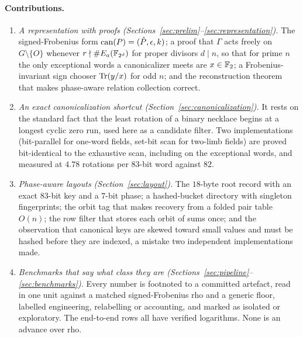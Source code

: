 \paragraph{Contributions.}
\begin{enumerate}[leftmargin=1.6em,itemsep=0.25em]
\item \emph{A representation with proofs
  (Sections~\ref{sec:prelim}--\ref{sec:representation}).} The
  signed-Frobenius form $\operatorname{can}(P)=(\hat P,\epsilon,k)$; a proof that
  $\Gamma$ acts freely on $G\setminus\{O\}$ whenever
  $r\nmid\#E_a(\mathbb{F}_{2^d})$ for proper divisors $d\mid n$, so that for
  prime $n$ the only exceptional words a canonicalizer meets are
  $x\in\mathbb{F}_2$; a Frobenius-invariant sign chooser $\operatorname{Tr}(y/x)$ for odd
  $n$; and the reconstruction theorem that makes phase-aware relation
  collection correct.
\item \emph{An exact canonicalization shortcut
  (Section~\ref{sec:canonicalization}).} It rests on the standard
  fact that the least rotation of a binary necklace begins at a
  longest cyclic zero run, used here as a candidate filter. Two
  implementations (bit-parallel for one-word fields, set-bit scan for
  two-limb fields) are proved bit-identical to the exhaustive scan,
  including on the exceptional words, and measured at $4.78$ rotations
  per $83$-bit word against $82$.
\item \emph{Phase-aware layouts (Section~\ref{sec:layout}).} The
  $18$-byte root record with an exact $83$-bit key and a $7$-bit phase;
  a hashed-bucket directory with singleton fingerprints; the orbit tag
  that makes recovery from a folded pair table $O(n)$; the row filter
  that stores each orbit of sums once; and the observation that
  canonical keys are skewed toward small values and must be hashed
  before they are indexed, a mistake two independent implementations
  made.
\item \emph{Benchmarks that say what class they are
  (Sections~\ref{sec:pipeline}--\ref{sec:benchmarks}).} Every number
  is footnoted to a committed artefact, read in one unit against a
  matched signed-Frobenius rho and a generic floor, labelled
  engineering, relabelling or accounting, and marked as isolated or
  exploratory. The end-to-end rows all have verified logarithms. None
  is an advance over rho.
\end{enumerate}

